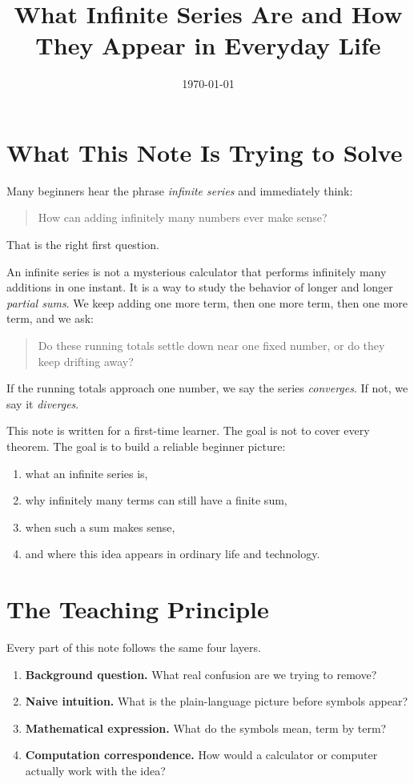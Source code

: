 \documentclass[11pt,a4paper]{article}
\title{What Infinite Series Are and How They Appear in Everyday Life}
\author{}
\date{\today}
\theoremstyle{definition}
\theoremstyle{plain}
\begin{document}
\maketitle
\tableofcontents
\newpage

\section{What This Note Is Trying to Solve}

Many beginners hear the phrase \emph{infinite series} and immediately think:
\begin{quote}
How can adding infinitely many numbers ever make sense?
\end{quote}

That is the right first question.

An infinite series is not a mysterious calculator that performs infinitely many additions in one instant.
It is a way to study the behavior of longer and longer \emph{partial sums}.
We keep adding one more term, then one more term, then one more term, and we ask:
\begin{quote}
Do these running totals settle down near one fixed number, or do they keep drifting away?
\end{quote}

If the running totals approach one number, we say the series \emph{converges}.
If not, we say it \emph{diverges}.

This note is written for a first-time learner.
The goal is not to cover every theorem.
The goal is to build a reliable beginner picture:
\begin{enumerate}
  \item what an infinite series is,
  \item why infinitely many terms can still have a finite sum,
  \item when such a sum makes sense,
  \item and where this idea appears in ordinary life and technology.
\end{enumerate}

\section{The Teaching Principle}

Every part of this note follows the same four layers.

\begin{enumerate}
  \item \textbf{Background question.}
  What real confusion are we trying to remove?
  \item \textbf{Naive intuition.}
  What is the plain-language picture before symbols appear?
  \item \textbf{Mathematical expression.}
  What do the symbols mean, term by term?
  \item \textbf{Computation correspondence.}
  How would a calculator or computer actually work with the idea?
\end{enumerate}
\end{document}
